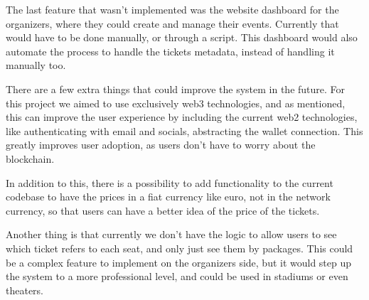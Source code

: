 The last feature that wasn't implemented was the website dashboard for the
organizers, where they could create and manage their events. Currently that
would have to be done manually, or through a script. This dashboard would also
automate the process to handle the tickets metadata, instead of handling it
manually too.

There are a few extra things that could improve the system in the future. For
this project we aimed to use exclusively web3 technologies, and as mentioned,
this can improve the user experience by including the current web2
technologies, like authenticating with email and socials, abstracting the
wallet connection. This greatly improves user adoption, as users don't have to
worry about the blockchain.

In addition to this, there is a possibility to add functionality to the current
codebase to have the prices in a fiat currency like euro, not in the network
currency, so that users can have a better idea of the price of the tickets.

Another thing is that currently we don't have the logic to allow users to see
which ticket refers to each seat, and only just see them by packages. This
could be a complex feature to implement on the organizers side, but it would
step up the system to a more professional level, and could be used in stadiums
or even theaters.